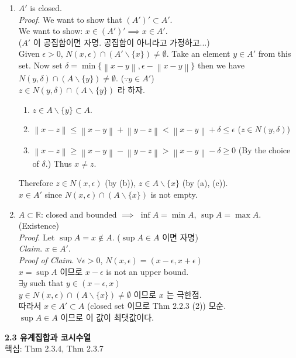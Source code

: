 \documentclass[12pt]{report}
\newcommand{\bb}[1]{\mathbb{#1}}
\newcommand{\norm}[1]{\left\lVert#1\right\rVert}
\newcommand{\imp}{\implies}
\newcommand{\bs}{\backslash}
\begin{document}
\begin{enumerate}
	\item $A'$ is closed.\\
	\textit{Proof}. We want to show that $(A')' \subset A'$.\\
	We want to show: $x\in (A')' \imp x\in A'$.\\
	($A'$ 이 공집합이면 자명. 공집합이 아니라고 가정하고...)\\
	Given $\epsilon>0$, $N(x, \epsilon)\cap (A'\bs \{x\}) \neq \emptyset$. Take an element $y\in A'$ from this set. Now set $\delta = \min\{\norm{x-y}, \epsilon - \norm{x-y} \}$ then we have $N(y, \delta) \cap (A\bs \{y\}) \neq \emptyset$. ($\because y\in A'$)\\
	$z \in N(y, \delta) \cap (A\bs \{y\})$ 라 하자.
	\begin{enumerate}
		\item $z\in A\bs \{y\} \subset A$.
		\item $\norm{x-z} \leq \norm{x-y} + \norm{y-z} < \norm{x-y} +\delta \leq \epsilon$ ($z\in N(y, \delta)$)
		\item $\norm{x-z} \geq \norm{x-y}-\norm{y-z}>\norm{x-y}-\delta \geq 0$ (By the choice of $\delta$.) Thus $x\neq z$.
	\end{enumerate}
	Therefore $z\in N(x, \epsilon)$ (by (b)), $z\in A\bs \{x\}$ (by (a), (c)).\\
	$x\in A'$ since $N(x, \epsilon)\cap (A\bs \{x\})$ is not empty.
	\item $A\subset \bb{R}$: closed and bounded $\imp$ $\inf A = \min A$, $\sup A = \max A$. (Existence)\\
	\textit{Proof}. Let $\sup A=x\notin A$. ($\sup A\in A$ 이면 자명)\\
	\textit{Claim}. $x\in A'$.\\
	\textit{Proof of Claim}. $\forall \epsilon>0$, $N(x, \epsilon) = (x-\epsilon, x+\epsilon)$\\
	$x = \sup A$ 이므로 $x-\epsilon$ is not an upper bound.\\
	$\exists y$ such that $y \in (x-\epsilon, x)$\\
	$y\in N(x, \epsilon) \cap (A\bs \{x\})\neq \emptyset$ 이므로 $x$ 는 극한점.\\
	따라서 $x\in A' \subset A$ (closed set 이므로 Thm 2.2.3 (2)) 모순. \\
	$\sup A\in A$ 이므로 이 값이 최댓값이다. 
\end{enumerate}
\pagebreak
\textbf{2.3 유계집합과 코시수열}\\
핵심: Thm 2.3.4, Thm 2.3.7\\
\end{document}
